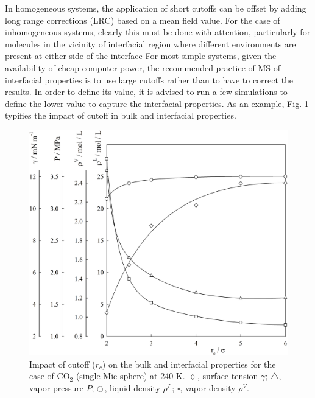 \documentclass[9pt,tutorial]{livecoms}
\begin{document}
In homogeneous systems, the application of short cutoffs can be offset by
adding long range corrections (LRC) based on a mean field value. For the case
of inhomogeneous systems, clearly this must be done with attention,
particularly for molecules in the vicinity of interfacial region where
different environments are present at either side of the interface
\citep{lotfi1990,janecek2006,siperstein2002,lishchuk2018}
For most simple systems, given the
availability of cheap computer power, the recommended practice of MS of interfacial
properties is to use large cutoffs rather than to have to correct the results. In
order to define its value, it is advised to run a few simulations to define the
lower value to capture the interfacial properties. As an example, Fig. \ref{fig:11}
typifies the impact of cutoff in bulk and interfacial properties. 

\begin{figure}
  \centering
\includegraphics[width=\linewidth]{gfx/fig_11_op4.JPG}
\caption{Impact of cutoff ($r_{c}$) on the bulk and interfacial properties for the case of CO$_{2}$ (single Mie sphere) at 240 K. $\lozenge$, surface tension $\gamma$; $\triangle$, vapor pressure $P$; $\ocircle$, liquid density $\rho^L$; $\square$, vapor density $\rho^V$.}
\label{fig:11}
\end{figure}
\end{document}
